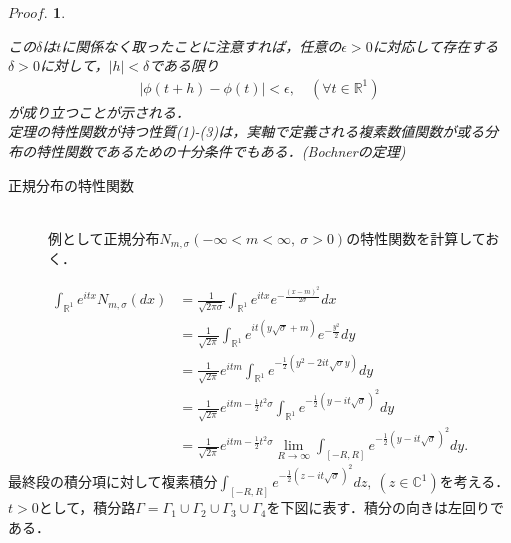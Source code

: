 \documentclass[a4j,papersize,disablejfam,slide,14pt]{jsarticle}
\newtheorem{Proof}{$Proof.$}
\def\exp#1{e^{#1}} %
\begin{document}
\begin{Proof}
\begin{description}
            この$\delta$は$t$に関係なく取ったことに注意すれば，任意の$\epsilon > 0$に対応して存在する$\delta > 0$に対して，$|h| < \delta$である限り
            \begin{align}
            	\left| \phi(t+h) - \phi(t) \right| < \epsilon, \quad (\forall t \in \mathbb{R}^1)
            \end{align}
            が成り立つことが示される．\\
            定理の特性関数が持つ性質(1)-(3)は，実軸で定義される複素数値関数が或る分布の特性関数であるための十分条件でもある．({\rm Bochner}の定理)
        \end{description}
    \end{Proof}
    
    \begin{screen}
    	\begin{description}
        	\item[正規分布の特性関数]\mbox{}\\
    			例として正規分布$N_{m,\sigma} (-\infty < m < \infty,\ \sigma > 0)$の特性関数を計算しておく．
        \end{description}
    \end{screen}
    
    \begin{align}
    	\int_{\mathbb{R}^1} \exp{itx} N_{m,\sigma} (dx) &= \frac{1}{\sqrt{2\pi \sigma}} \int_{\mathbb{R}^1} \exp{itx} \exp{-\frac{(x-m)^2}{2\sigma}} dx \\
        &= \frac{1}{\sqrt{2\pi}} \int_{\mathbb{R}^1} \exp{it(y\sqrt{\sigma}+m)} \exp{-\frac{y^2}{2}} dy \\
        &= \frac{1}{\sqrt{2\pi}} \exp{itm} \int_{\mathbb{R}^1} \exp{-\frac{1}{2} (y^2 - 2it\sqrt{\sigma}y)} dy \\
        &= \frac{1}{\sqrt{2\pi}} \exp{itm-\frac{1}{2} t^2\sigma} \int_{\mathbb{R}^1} \exp{-\frac{1}{2} (y - it\sqrt{\sigma})^2} dy \\
        &= \frac{1}{\sqrt{2\pi}} \exp{itm-\frac{1}{2} t^2\sigma} \lim_{R \to \infty} \int_{[-R,R]} \exp{-\frac{1}{2} (y - it\sqrt{\sigma})^2} dy.
    \end{align}
    最終段の積分項に対して複素積分$\int_{[-R,R]} \exp{-\frac{1}{2} (z - it\sqrt{\sigma})^2} dz,\ (z \in \mathbb{C}^1)$を考える．
    $t > 0$として，積分路$\Gamma = \Gamma_1 \cup \Gamma_2 \cup \Gamma_3 \cup \Gamma_4$を下図に表す．積分の向きは左回りである．
    
\end{document}
